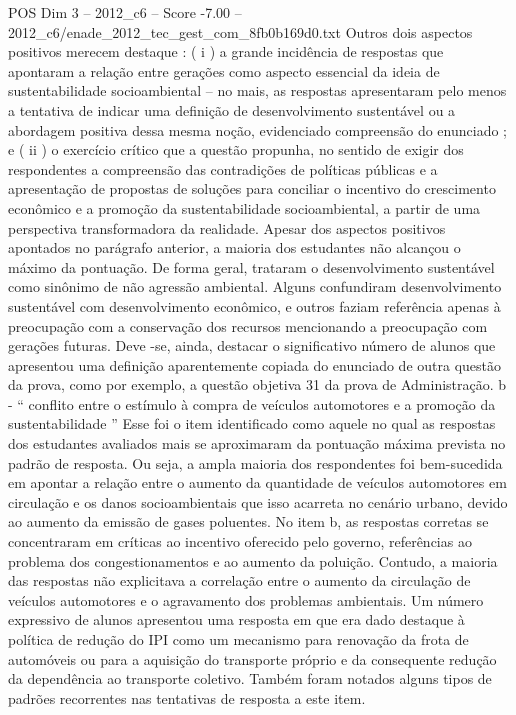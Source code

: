 \begin{textsample}{POS Dim 3 – 2012\_c6 – Score -7.00 – 2012\_c6/enade\_2012\_tec\_gest\_com\_8fb0b169d0.txt}
Outros dois aspectos positivos merecem destaque : ( i ) a grande incidência de respostas que apontaram a relação entre gerações como aspecto essencial da ideia de sustentabilidade socioambiental – no mais, as respostas apresentaram pelo menos a tentativa de indicar uma definição de desenvolvimento sustentável ou a abordagem positiva dessa mesma noção, evidenciado compreensão do enunciado ; e ( ii ) o exercício crítico que a questão propunha, no sentido de exigir dos respondentes a compreensão das contradições de políticas públicas e a apresentação de propostas de soluções para conciliar o incentivo do crescimento econômico e a promoção da sustentabilidade socioambiental, a partir de uma perspectiva transformadora da realidade.
Apesar dos aspectos positivos apontados no parágrafo anterior, a maioria dos estudantes não alcançou o máximo da pontuação.
De forma geral, trataram o desenvolvimento sustentável como sinônimo de não agressão ambiental.
Alguns confundiram desenvolvimento sustentável com desenvolvimento econômico, e outros faziam referência apenas à preocupação com a conservação dos recursos mencionando a preocupação com gerações futuras.
Deve -se, ainda, destacar o significativo número de alunos que apresentou uma definição aparentemente copiada do enunciado de outra questão da prova, como por exemplo, a questão objetiva 31 da prova de Administração. b - “ conflito entre o estímulo à compra de veículos automotores e a promoção da sustentabilidade ” Esse foi o item identificado como aquele no qual as respostas dos estudantes avaliados mais se aproximaram da pontuação máxima prevista no padrão de resposta.
Ou seja, a ampla maioria dos respondentes foi bem-sucedida em apontar a relação entre o aumento da quantidade de veículos automotores em circulação e os danos socioambientais que isso acarreta no cenário urbano, devido ao aumento da emissão de gases poluentes.
No item b, as respostas corretas se concentraram em críticas ao incentivo oferecido pelo governo, referências ao problema dos congestionamentos e ao aumento da poluição.
Contudo, a maioria das respostas não explicitava a correlação entre o aumento da circulação de veículos automotores e o agravamento dos problemas ambientais.
Um número expressivo de alunos apresentou uma resposta em que era dado destaque à política de redução do IPI como um mecanismo para renovação da frota de automóveis ou para a aquisição do transporte próprio e da consequente redução da dependência ao transporte coletivo.
Também foram notados alguns tipos de padrões recorrentes nas tentativas de resposta a este item.

\end{textsample}
